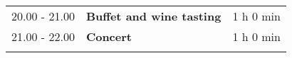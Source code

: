 \begin{longtable}{p{3cm}p{10cm}p{4cm}}
\vspace{1cm}
20.00 - 21.00 & {\bf Buffet and wine tasting} & \hfill 1 h 0 min\\ 
\vspace{1cm}
21.00 - 22.00 & {\bf Concert} & \hfill 1 h 0 min\\ 
\vspace{1cm}
\end{longtable}

